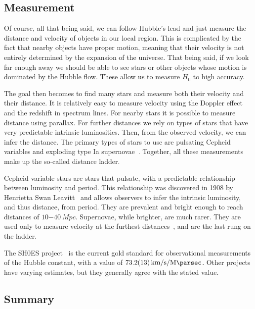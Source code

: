 \documentclass[12pt]{article}
\newcommand{\units}{\kilo\meter\per\second\per\mega\parsec}
\newcommand{\hnaught}[1]{\SI{#1}{\units}}
\begin{document}
\subsection{Measurement} \label{sub:measure}

Of course, all that being said, we can follow Hubble's lead and just measure the distance and velocity of objects in our local region. This is complicated by the fact that nearby objects 
have proper motion, meaning that their velocity is not entirely determined by the expansion of the universe. That being said, if we look far enough away we should be able to
see stars or other objects whose motion is dominated by the Hubble flow. These allow us to measure $H_0$ to high accuracy. 

The goal then becomes to find many stars and measure both their velocity and their distance. It is relatively easy to measure velocity using the Doppler effect and the redshift in spectrum lines. For nearby stars it is possible to measure distance using parallax. For further distances we rely on types of stars that have very predictable intrinsic luminosities. Then, from the observed velocity, we can infer the distance. The primary types of stars to use are pulsating Cepheid variables and exploding type Ia supernovae~\cite{DiValentino2021}. Together, all these measurements make up the so-called distance ladder.

Cepheid variable stars are stars that pulsate, with a predictable relationship between luminosity and period. This relationship was discovered in 1908 by Henrietta Swan Leavitt~\cite{Leavitt1912} and allows observers to infer the intrinsic luminosity, and thus distance, from period. They are prevalent and bright enough to reach distances of $\SI{10-40}{Mpc}$. Supernovae, while brighter, are much rarer. They are used only to measure velocity at the furthest distances~\cite{DiValentino2021}, and are the last rung on the ladder.

The SH0ES project~\cite{Riess2020} is the current gold standard for observational measurements of the Hubble constant, with a value of $\hnaught{73.2 \pm 1.3}$. Other projects have varying estimates, but they generally agree with the stated value.

\subsection{Summary} \label{sub:sum}
\end{document}
